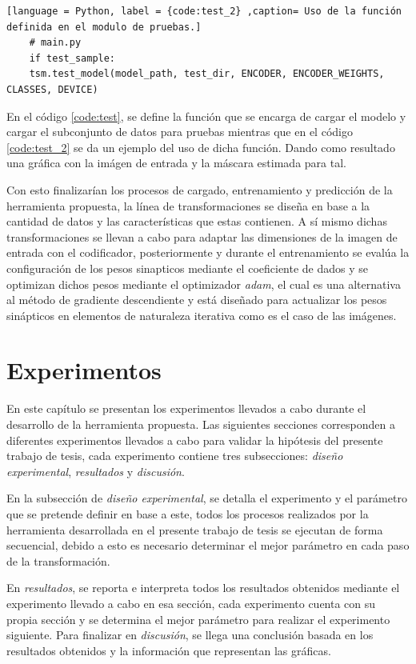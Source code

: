 \begin{lstlisting}[language = Python, label = {code:test_2} ,caption= Uso de la función definida en el modulo de pruebas.]
    # main.py
    if test_sample:
    tsm.test_model(model_path, test_dir, ENCODER, ENCODER_WEIGHTS, CLASSES, DEVICE)
\end{lstlisting}

En el código \ref{code:test}, se define la función que se encarga de cargar el modelo y cargar el subconjunto de datos para pruebas mientras que en el código \ref{code:test_2} se da un ejemplo del uso de dicha función. Dando como resultado una gráfica con la imágen de entrada y la máscara estimada para tal.

Con esto finalizarían los procesos de cargado, entrenamiento y predicción de la herramienta propuesta, la línea de transformaciones se diseña en base a la cantidad de datos y las características que estas contienen. A sí mismo dichas transformaciones se llevan a cabo para adaptar las dimensiones de la imagen de entrada con el codificador, posteriormente y durante el entrenamiento se evalúa la configuración de los pesos sinapticos mediante el coeficiente de dados y se optimizan dichos pesos mediante el optimizador \emph{adam}, el cual es una alternativa al método de gradiente descendiente y está diseñado para actualizar los pesos sinápticos en elementos de naturaleza iterativa como es el caso de las imágenes. 



\chapter{Experimentos}
En este capítulo se presentan los experimentos llevados a cabo durante el desarrollo de la herramienta propuesta. Las siguientes secciones corresponden a diferentes experimentos llevados a cabo para validar la hipótesis del presente trabajo de tesis, cada experimento contiene tres subsecciones: \emph{diseño experimental}, \emph{resultados} y \emph{discusión}.

En la subsección de \emph{diseño experimental}, se detalla el experimento y el parámetro que se pretende definir en base a este, todos los procesos realizados por la herramienta desarrollada en el presente trabajo de tesis se ejecutan de forma secuencial, debido a esto es necesario determinar el mejor parámetro en cada paso de la transformación.

En \emph{resultados}, se reporta e interpreta todos los resultados obtenidos mediante el experimento llevado a cabo en esa sección, cada experimento cuenta con su propia sección y se determina el mejor parámetro para realizar el experimento siguiente. Para finalizar en \emph{discusión}, se llega una conclusión basada en los resultados obtenidos y la información que representan las gráficas.


